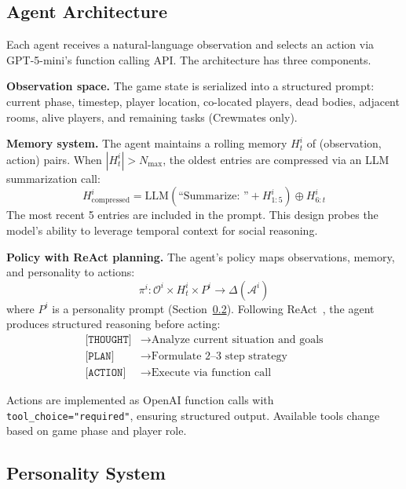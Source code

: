 \documentclass{article}
\begin{document}
\subsection{Agent Architecture}

Each agent receives a natural-language observation and selects an action via GPT-5-mini's function calling API. The architecture has three components.

\textbf{Observation space.} The game state is serialized into a structured prompt: current phase, timestep, player location, co-located players, dead bodies, adjacent rooms, alive players, and remaining tasks (Crewmates only).

\textbf{Memory system.} The agent maintains a rolling memory $H^i_t$ of (observation, action) pairs. When $|H^i_t| > N_{\max}$, the oldest entries are compressed via an LLM summarization call:
\begin{equation}
    H^i_{\text{compressed}} = \text{LLM}(\text{``Summarize: ''} + H^i_{1:5}) \oplus H^i_{6:t}
    \label{eq:memory}
\end{equation}
The most recent 5 entries are included in the prompt. This design probes the model's ability to leverage temporal context for social reasoning.

\textbf{Policy with ReAct planning.} The agent's policy maps observations, memory, and personality to actions:
\begin{equation}
    \pi^i : \mathcal{O}^i \times H^i_t \times P^i \to \Delta(\mathcal{A}^i)
    \label{eq:policy}
\end{equation}
where $P^i$ is a personality prompt (Section~\ref{sec:personality}). Following ReAct~\cite{yao2023react}, the agent produces structured reasoning before acting:
\begin{align*}
    \texttt{[THOUGHT]} &\to \text{Analyze current situation and goals} \\
    \texttt{[PLAN]} &\to \text{Formulate 2--3 step strategy} \\
    \texttt{[ACTION]} &\to \text{Execute via function call}
\end{align*}

Actions are implemented as OpenAI function calls with \texttt{tool\_choice="required"}, ensuring structured output. Available tools change based on game phase and player role.

\subsection{Personality System}
\label{sec:personality}
\end{document}
